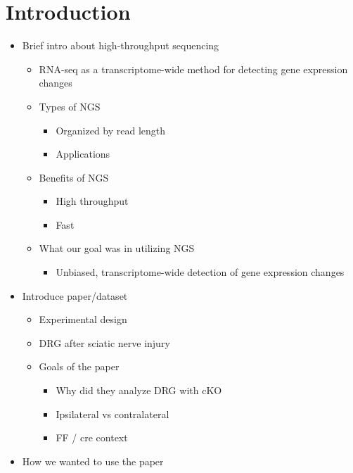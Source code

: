 \documentclass[12pt]{article}
\begin{document}
\section*{\textcolor{nikhicolor}{Introduction}}
\begin{itemize}
\item \textcolor{nikhicolor}{Brief intro about high-throughput sequencing}
\begin{itemize}
\item \textcolor{pitercolor}{RNA-seq as a transcriptome-wide method for detecting gene expression changes}
\item \textcolor{nikhicolor}{Types of NGS}
\begin{itemize}
\item \textcolor{nikhicolor}{Organized by read length}
\item \textcolor{nikhicolor}{Applications}
\end{itemize}
\item \textcolor{nikhicolor}{Benefits of NGS}
\begin{itemize}
\item \textcolor{nikhicolor}{High throughput}
\item \textcolor{nikhicolor}{Fast}
\end{itemize}
\item \textcolor{nikhicolor}{What our goal was in utilizing NGS}
\begin{itemize}
\item \textcolor{pitercolor}{Unbiased, transcriptome-wide detection of gene expression changes}
\end{itemize}
\end{itemize}
\item \textcolor{samcolor}{Introduce paper/dataset}
\begin{itemize}
\item \textcolor{samcolor}{Experimental design}
\item \textcolor{samcolor}{DRG after sciatic nerve injury}
\item \textcolor{samcolor}{Goals of the paper}
\begin{itemize}
\item \textcolor{samcolor}{Why did they analyze DRG with cKO}
\item \textcolor{samcolor}{Ipsilateral vs contralateral}
\item \textcolor{pitercolor}{FF / cre context}
\end{itemize}
\end{itemize}
\item \textcolor{samcolor}{How we wanted to use the paper}

\end{itemize}
\end{document}
